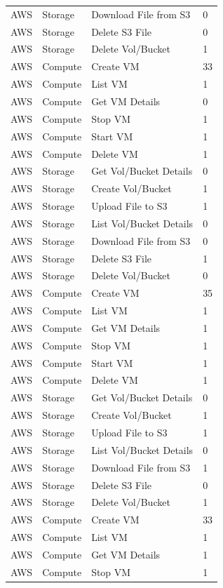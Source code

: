 \begin{table}[htb]
\begin{tabular} {p{3cm}|p{3cm}|p{5cm}|p{3cm}}
AWS & Storage & Download File from S3 & 0  \\
AWS & Storage & Delete S3 File & 0  \\
AWS & Storage & Delete Vol/Bucket & 1  \\
AWS & Compute & Create VM & 33  \\
AWS & Compute & List VM & 1  \\
AWS & Compute & Get VM Details & 0  \\
AWS & Compute & Stop VM & 1  \\
AWS & Compute & Start VM & 1  \\
AWS & Compute & Delete VM & 1  \\
AWS & Storage & Get Vol/Bucket Details & 0  \\
AWS & Storage & Create Vol/Bucket & 1  \\
AWS & Storage & Upload File to S3 & 1  \\
AWS & Storage & List Vol/Bucket Details & 0  \\
AWS & Storage & Download File from S3 & 0  \\
AWS & Storage & Delete S3 File & 1  \\
AWS & Storage & Delete Vol/Bucket & 0  \\
AWS & Compute & Create VM & 35  \\
AWS & Compute & List VM & 1  \\
AWS & Compute & Get VM Details & 1  \\
AWS & Compute & Stop VM & 1  \\
AWS & Compute & Start VM & 1  \\
AWS & Compute & Delete VM & 1  \\
AWS & Storage & Get Vol/Bucket Details & 0  \\
AWS & Storage & Create Vol/Bucket & 1  \\
AWS & Storage & Upload File to S3 & 1  \\
AWS & Storage & List Vol/Bucket Details & 0  \\
AWS & Storage & Download File from S3 & 1  \\
AWS & Storage & Delete S3 File & 0  \\
AWS & Storage & Delete Vol/Bucket & 1  \\
AWS & Compute & Create VM & 33  \\
AWS & Compute & List VM & 1  \\
AWS & Compute & Get VM Details & 1  \\
AWS & Compute & Stop VM & 1  \\

\end{tabular}
\end{table}

